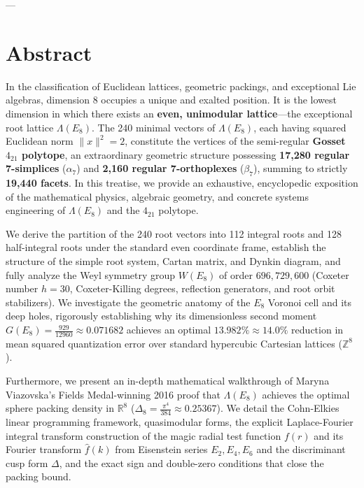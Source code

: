 \documentclass[11pt,twoside,openright]{amsbook}
\begin{document}
---

\section{Abstract}

In the classification of Euclidean lattices, geometric packings, and exceptional Lie algebras, dimension 8 occupies a unique and exalted position. It is the lowest dimension in which there exists an \textbf{even, unimodular lattice}—the exceptional root lattice $\Lambda(E_8)$. The 240 minimal vectors of $\Lambda(E_8)$, each having squared Euclidean norm $\|x\|^2 = 2$, constitute the vertices of the semi-regular \textbf{Gosset $4_{21}$ polytope}, an extraordinary geometric structure possessing \textbf{17,280 regular 7-simplices} ($\alpha_7$) and \textbf{2,160 regular 7-orthoplexes} ($\beta_7$), summing to strictly \textbf{19,440 facets}. In this treatise, we provide an exhaustive, encyclopedic exposition of the mathematical physics, algebraic geometry, and concrete systems engineering of $\Lambda(E_8)$ and the $4_{21}$ polytope.

We derive the partition of the 240 root vectors into 112 integral roots and 128 half-integral roots under the standard even coordinate frame, establish the structure of the simple root system, Cartan matrix, and Dynkin diagram, and fully analyze the Weyl symmetry group $W(E_8)$ of order $696,729,600$ (Coxeter number $h = 30$, Coxeter-Killing degrees, reflection generators, and root orbit stabilizers). We investigate the geometric anatomy of the $E_8$ Voronoi cell and its deep holes, rigorously establishing why its dimensionless second moment $G(E_8) = \frac{929}{12960} \approx 0.071682$ achieves an optimal $13.982\% \approx 14.0\%$ reduction in mean squared quantization error over standard hypercubic Cartesian lattices ($\mathbb{Z}^8$).

Furthermore, we present an in-depth mathematical walkthrough of Maryna Viazovska's Fields Medal-winning 2016 proof that $\Lambda(E_8)$ achieves the optimal sphere packing density in $\mathbb{R}^8$ ($\Delta_8 = \frac{\pi^4}{384} \approx 0.25367$). We detail the Cohn-Elkies linear programming framework, quasimodular forms, the explicit Laplace-Fourier integral transform construction of the magic radial test function $f(r)$ and its Fourier transform $\widehat{f}(k)$ from Eisenstein series $E_2, E_4, E_6$ and the discriminant cusp form $\Delta$, and the exact sign and double-zero conditions that close the packing bound. 
\end{document}
